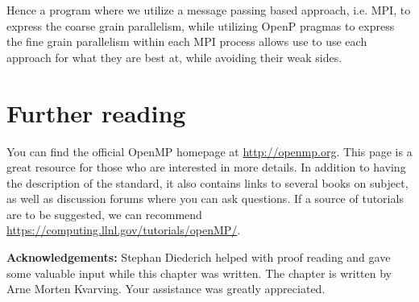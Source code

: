 Hence a program where we utilize a message passing based approach, i.e. MPI, to
express the coarse grain parallelism, while utilizing OpenP pragmas to express
the fine grain parallelism within each MPI process allows use to use each
approach for what they are best at, while avoiding their weak sides.

\section{Further reading}

You can find the official OpenMP homepage at \url{http://openmp.org}. This page
is a great resource for those who are interested in more details. In addition to
having the description of the standard, it also contains links to several books
on subject, as well as discussion forums where you can ask questions. If a
source of tutorials are to be suggested, we can recommend
\url{https://computing.llnl.gov/tutorials/openMP/}.

\textbf{Acknowledgements:} Stephan Diederich helped with proof reading and gave
some valuable input while this chapter was written. The chapter is written by
Arne Morten Kvarving. Your assistance was greatly appreciated.
